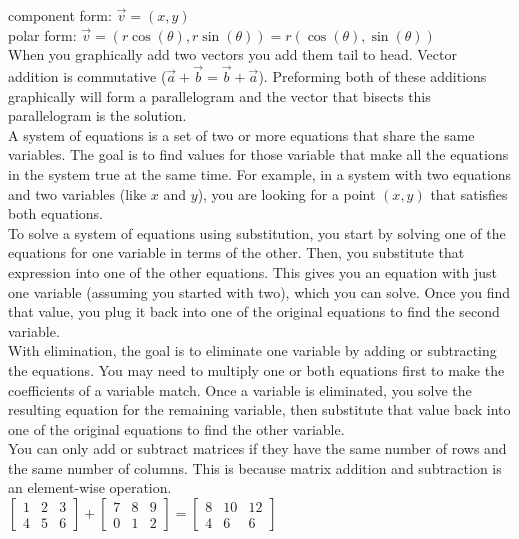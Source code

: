 \documentclass{article}
\begin{document}
component form: $\vec{v} = (x, y)$\\
polar form: $\vec{v} = (r\cos(\theta), r\sin(\theta)) = r(\cos(\theta), \sin(\theta))$\\

When you graphically add two vectors you add them tail to head. Vector addition is commutative ($\vec{a} + \vec{b} = \vec{b} + \vec{a}$). Preforming both of these additions graphically will form a parallelogram and the vector that bisects this parallelogram is the solution.\\ 

A system of equations is a set of two or more equations that share the same variables. The goal is to find values for those variable that make all the equations in the system true at the same time. For example, in a system with two equations and two variables (like $x$ and $y$), you are looking for a point $(x, y)$ that satisfies both equations.\\

To solve a system of equations using substitution, you start by solving one of the equations for one variable in terms of the other. Then, you substitute that expression into one of the other equations. This gives you an equation with just one variable (assuming you started with two), which you can solve. Once you find that value, you plug it back into one of the original equations to find the second variable.\\

With elimination, the goal is to eliminate one variable by adding or subtracting the equations. You may need to multiply one or both equations first to make the coefficients of a variable match. Once a variable is eliminated, you solve the resulting equation for the remaining variable, then substitute that value back into one of the original equations to find the other variable.\\

You can only add or subtract matrices if they have the same number of rows and the same number of columns. This is because matrix addition and subtraction is an element-wise operation.\\

$
\begin{bmatrix}
	1 & 2 & 3\\
	4 & 5 & 6
\end{bmatrix}
+
\begin{bmatrix}
	7 & 8 & 9\\
	0 & 1 & 2
\end{bmatrix}
=
\begin{bmatrix}
	8 & 10 & 12\\
	4 & 6 & 6
\end{bmatrix}
$\\\\
\end{document}
